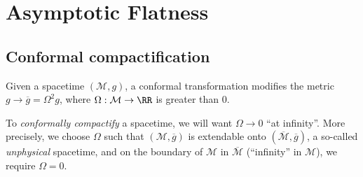 \documentclass{jknotes}
\begin{document}
\section{Asymptotic Flatness}
\subsection{Conformal compactification}
\begin{defn}
    Given a spacetime \((\mathcal{M},g)\), a conformal transformation modifies the metric \(g \to \overline{g} = \Omega^2 g\), where \(\Omega:\mathcal{M}\to\RR\) is greater than 0.
\end{defn}

To \emph{conformally compactify} a spacetime, we will want \(\Omega \to 0\) ``at infinity''. More precisely, we choose \(\Omega\) such that \((\mathcal{M},\overline{g})\) is extendable onto \((\overline{\mathcal{M}}, \overline{g})\), a so-called \emph{unphysical} spacetime, and on the boundary of \(\mathcal{M}\) in \(\overline{\mathcal{M}}\) (``infinity'' in \(\mathcal{M}\)), we require \(\Omega=0\).
\begin{figure}[H]
    \centering
\end{figure}
\end{document}
